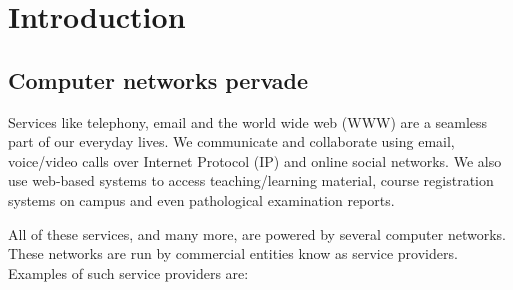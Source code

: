 \chapter{Introduction}
\label{chap:intro}

\section{Computer networks pervade}
Services like telephony, email and the world wide web (WWW) are a seamless part of our everyday lives. We communicate and collaborate using email, voice/video calls over Internet Protocol (IP) and online social networks. We also use web-based systems to access teaching/learning material, course registration systems on campus and even pathological examination reports. 

All of these services, and many more, are powered by several computer networks. These networks are run by commercial entities know as service providers. Examples of such service providers are: 

